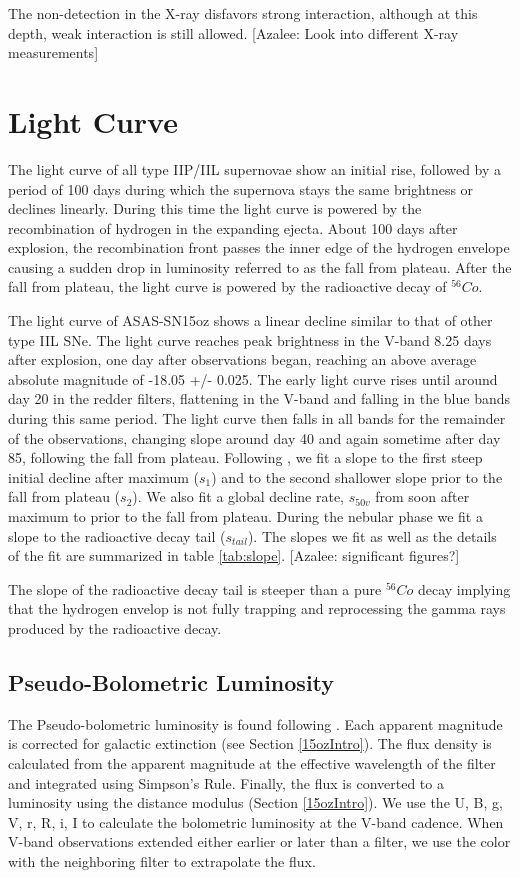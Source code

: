\documentclass[preprint]{aastex61}
\newcommand{\azaleecomment}[1]{{\color{red} [{#1}]}}
\newcommand{\Azalee}[1]{\azaleecomment{Azalee: #1}}
\begin{document}
The non-detection in the X-ray disfavors strong interaction, although at this depth, weak interaction is still allowed. \Azalee{Look into different X-ray measurements}

\section{Light Curve} \label{LC}
The light curve of all type IIP/IIL supernovae show an initial rise, followed by a period of 100 days during which the supernova stays the same brightness or declines linearly. 
During this time the light curve is powered by the recombination of hydrogen in the expanding ejecta. 
About 100 days after explosion, the recombination front passes the inner edge of the hydrogen envelope causing a sudden drop in luminosity referred to as the fall from plateau.  
After the fall from plateau, the light curve is powered by the radioactive decay of ${}^{56}Co$.

The light curve of ASAS-SN15oz shows a linear decline similar to that of other type IIL SNe. 
The light curve reaches peak brightness in the V-band 8.25 days after explosion, one day after observations began, reaching an above average absolute magnitude of -18.05 +/- 0.025.
The early light curve rises until around day 20 in the redder filters, flattening in the V-band and falling in the blue bands during this same period. 
The light curve then falls in all bands for the remainder of the observations, changing slope around day 40 and again sometime after day 85, following the fall from plateau. 
Following \citep{2014Anderson}, we fit a slope to the first steep initial decline after maximum ($s_1$) and to the second shallower slope prior to the fall from plateau ($s_2$). 
We also fit a global decline rate, $s_{50v}$ from soon after maximum to prior to the fall from plateau.
During the nebular phase we fit a slope to the radioactive decay tail ($s_{tail}$). 
The slopes we fit as well as the details of the fit are summarized in table \ref{tab:slope}.
\Azalee{significant figures?}
  \label{tab:slope}%

The slope of the radioactive decay tail is steeper than a pure ${}^{56}Co$ decay implying that the hydrogen envelop is not fully trapping and reprocessing the gamma rays produced by the radioactive decay.

\subsection{Pseudo-Bolometric Luminosity}
The Pseudo-bolometric luminosity is found following \citet{2008valenti}.
Each apparent magnitude is corrected for galactic extinction (see Section \ref{15ozIntro}).
The flux density is calculated from the apparent magnitude at the effective wavelength of the filter and integrated using Simpson's Rule. 
Finally, the flux is converted to a luminosity using the distance modulus (Section \ref{15ozIntro}). 
We use  the U, B, g, V, r, R, i, I to calculate the bolometric luminosity at the V-band cadence.
When V-band observations extended either earlier or later than a filter, we use the color with the neighboring filter to extrapolate the flux.
\end{document}
